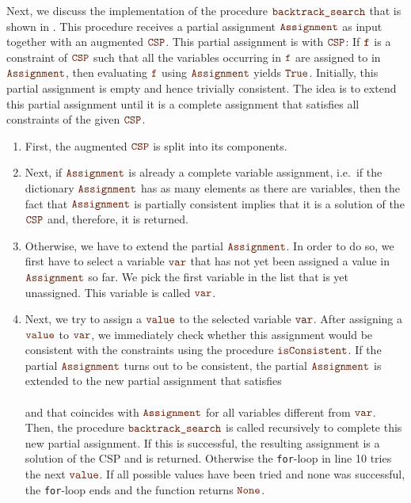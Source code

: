 Next, we discuss the implementation of the procedure $\mytt{backtrack\_search}$ that is shown in
.  This procedure receives a partial assignment 
$\mytt{Assignment}$ as input together with an augmented $\mytt{CSP}$.  This partial assignment is
 with $\mytt{CSP}$:  If $\mytt{f}$ is a constraint of $\mytt{CSP}$ such that
all the variables occurring in $\mytt{f}$ are assigned to in $\mytt{Assignment}$, then evaluating
$\mytt{f}$ using $\mytt{Assignment}$ yields $\mytt{True}$.  Initially, this partial assignment is empty
and hence trivially consistent.  The idea is to extend this partial assignment until it is a complete
assignment that satisfies all constraints of the given $\mytt{CSP}$.
\begin{enumerate}
\item First, the augmented $\mytt{CSP}$ is split into its components.
\item Next, if $\mytt{Assignment}$ is already a complete variable assignment, i.e.~if the dictionary
      $\mytt{Assignment}$ has as many elements as there are variables, then the fact that
      $\mytt{Assignment}$ is partially consistent implies that
      it is a solution of the $\mytt{CSP}$ and, therefore, it is returned.
\item Otherwise, we have to extend the partial $\mytt{Assignment}$.  In order to do so, we first have to
      select a variable $\mytt{var}$ that has not yet been assigned a value in $\mytt{Assignment}$ so far.
      We pick the first variable in the list  that is yet unassigned.
      This variable is called $\mytt{var}$.
\item Next, we try to assign a $\mytt{value}$ to the selected variable $\mytt{var}$.  After assigning
      a $\mytt{value}$ to $\mytt{var}$, we immediately check whether this assignment would be consistent
      with the constraints using the procedure $\mytt{isConsistent}$.
      If the partial $\mytt{Assignment}$ turns out to be consistent, the partial $\mytt{Assignment}$
      is extended to the new partial assignment  that satisfies
      \\[0.2cm]
      \hspace*{1.3cm}
      \\[0.2cm]
      and that coincides with $\mytt{Assignment}$ for all variables different from $\mytt{var}$.
      Then, the procedure $\mytt{backtrack\_search}$ is called recursively to complete this new partial assignment.
      If this is successful, the resulting assignment is a solution of the CSP and is returned.  Otherwise the
      \texttt{for}-loop in line 10 tries the next $\mytt{value}$.
      If all possible values have been tried and none was successful, the \texttt{for}-loop
      ends and the function returns $\mytt{None}$.
\end{enumerate}


